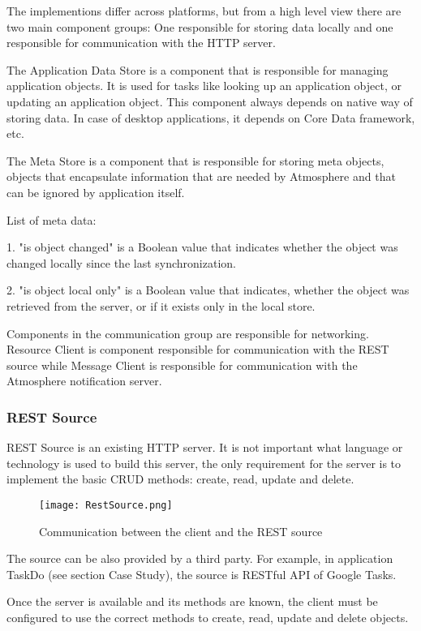The implementions differ across platforms, but from a high level view there are two main component groups: One responsible for storing data locally and one responsible for communication with the HTTP server.

The Application Data Store is a component that is responsible for managing application objects. It is used for tasks like looking up an application object, or updating an application object. This component always depends on native way of storing data. In case of desktop applications, it depends on Core Data framework, etc. 

The Meta Store is a component that is responsible for storing meta objects, objects that encapsulate information that are needed by Atmosphere and that can be ignored by application itself.

List of meta data:

1. "is object changed" is a Boolean value that indicates whether the object was changed locally since the last synchronization. 

2. "is object local only" is a Boolean value that indicates, whether the object was retrieved from the server, or if it exists only in the local store. 

Components in the communication group are responsible for networking. Resource Client is component responsible for communication with the REST source while Message Client is responsible for communication with the Atmosphere notification server. 

\subsubsection{REST Source}

REST Source is an existing HTTP server. It is not important what language or technology is used to build this server, the only requirement for the server is to implement the basic CRUD methods: create, read, update and delete.

\begin{figure}[ht!]
\centering
\texttt{[image: RestSource.png]}
\caption{Communication between the client and the REST source \label{fig:4}}
\end{figure}

The source can be also provided by a third party. For example, in application TaskDo (see section Case Study), the source is RESTful API of Google Tasks. 

Once the server is available and its methods are known, the client must be configured to use the correct methods to create, read, update and delete objects.

